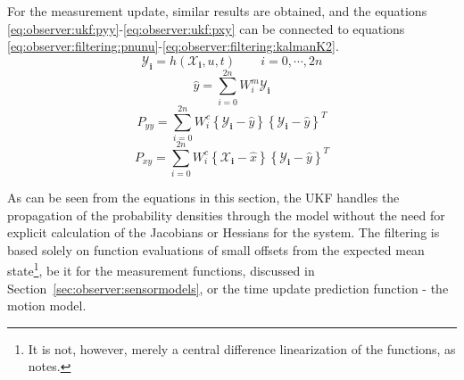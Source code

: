     For the measurement update, similar results are obtained, and the equations
    \eqref{eq:observer:ukf:pyy}-\eqref{eq:observer:ukf:pxy} can be connected to
    equations \eqref{eq:observer:filtering:pnunu}-\eqref{eq:observer:filtering:kalmanK2}.
    \begin{equation}
        \mathbf{\mathcal{Y}_{i}} = h(\mathbf{\mathcal{X}_{i}}, u, t) \qquad i = 0,\cdots,2n
    \end{equation}
    \begin{equation}
        \hat{y} = \sum_{i=0}^{2n}W^{m}_{i}\mathbf{\mathcal{Y}_{i}}
    \end{equation}
    \begin{equation}
        \label{eq:observer:ukf:pyy}
        P_{yy} = \sum_{i=0}^{2n}W^{c}_{i}
            \left\lbrace \mathbf{\mathcal{Y}_{i}} - \hat{y} \right\rbrace
            \left\lbrace \mathbf{\mathcal{Y}_{i}} - \hat{y} \right\rbrace^{T}
    \end{equation}
    \begin{equation}
        \label{eq:observer:ukf:pxy}
        P_{xy} = \sum_{i=0}^{2n}W^{c}_{i}
            \left\lbrace \mathbf{\mathcal{X}_{i}} - \hat{x} \right\rbrace
            \left\lbrace \mathbf{\mathcal{Y}_{i}} - \hat{y} \right\rbrace^{T}
    \end{equation}

    As can be seen from the equations in this section, the UKF handles the
    propagation of the probability densities through the model without
    the need for explicit calculation of the Jacobians or Hessians for the system.
    The filtering is based solely on function evaluations of small offsets from the
    expected mean state\footnote{It is not, however, merely a central difference linearization of the functions, as \citep{Julier95anewapproach} notes.},
    be it for the measurement functions, discussed in
    Section~\ref{sec:observer:sensormodels}, or the time update
    prediction function - the motion model.
